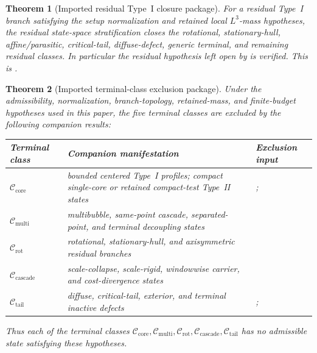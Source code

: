\documentclass[11pt]{amsart}
\numberwithin{equation}{section}
\theoremstyle{plain}
\newtheorem{theorem}{Theorem}[section]
\theoremstyle{definition}
\theoremstyle{remark}
\begin{document}
\begin{theorem}[Imported residual Type~I closure package]
\label{imp:residual-typeI-closure}
For a residual Type~I branch satisfying the setup normalization and retained
local \(L^3\)-mass hypotheses, the residual state-space stratification closes
the rotational, stationary-hull, affine/parasitic, critical-tail,
diffuse-defect, generic terminal, and remaining residual classes.  In
particular the residual hypothesis left open by
 is verified.  This is
\cite[Theorems~1.14, 4.4, 9.27, 9.38, 9.91, 9.98, 9.113, 10.25, 11.2, 11.3,
and~12.1; Propositions~6.10 and~7.1; Remark~7.4; Corollary~12.2]{BallesterResidual}.
\end{theorem}

\begin{theorem}[Imported terminal-class exclusion package]
\label{imp:terminal-class-exclusion}
Under the admissibility, normalization, branch-topology, retained-mass, and
finite-budget hypotheses used in this paper, the five terminal classes are
excluded by the following companion results:
\begin{center}\small
\setlength{\tabcolsep}{4pt}
\begin{tabular}{@{}>{\raggedright\arraybackslash}p{}
				>{\raggedright\arraybackslash}p{}
				>{\raggedright\arraybackslash}p{}@{}}
\toprule
Terminal class & Companion manifestation & Exclusion input \\
\midrule
\(\mathcal C_{\mathrm{core}}\) &
bounded centered Type~I profiles; compact single-core or retained compact-test
Type~II states &
\cite[Theorems~15.7--15.9, 21.4, and~25.5]{BallesterSetup};
\cite[Theorems~2.19, 9.103, and~10.5]{BallesterTypeII} \\
\(\mathcal C_{\mathrm{multi}}\) &
multibubble, same-point cascade, separated-point, and terminal decoupling
states &
\cite[Theorems~4.19, 4.20, 4.45, 8.6, 8.14, and~10.6]{BallesterTypeII} \\
\(\mathcal C_{\mathrm{rot}}\) &
rotational, stationary-hull, and axisymmetric residual branches &
\cite[Theorem~4.4; Propositions~6.10 and~7.1; Remark~7.4; Theorem~10.25]{BallesterResidual} \\
\(\mathcal C_{\mathrm{cascade}}\) &
scale-collapse, scale-rigid, windowwise carrier, and cost-divergence states &
\cite[Theorems~6.7, 6.20, 6.24, 7.130, and~9.42;
Corollaries~7.123, 7.128, and~9.43; Proposition~4.43]{BallesterTypeII} \\
\(\mathcal C_{\mathrm{tail}}\) &
diffuse, critical-tail, exterior, and terminal inactive defects &
\cite[Theorems~9.27, 9.38, 9.91, 9.98, and~9.113]{BallesterResidual};
\cite[Theorems~8.38, 8.41, 8.46, 9.89, 9.91, and~9.94]{BallesterTypeII} \\
\bottomrule
\end{tabular}
\end{center}
Thus each of the terminal classes
\(\mathcal C_{\mathrm{core}}, \mathcal C_{\mathrm{multi}},
\mathcal C_{\mathrm{rot}}, \mathcal C_{\mathrm{cascade}},
\mathcal C_{\mathrm{tail}}\) has no admissible state satisfying these
hypotheses.
\end{theorem}
\end{document}

